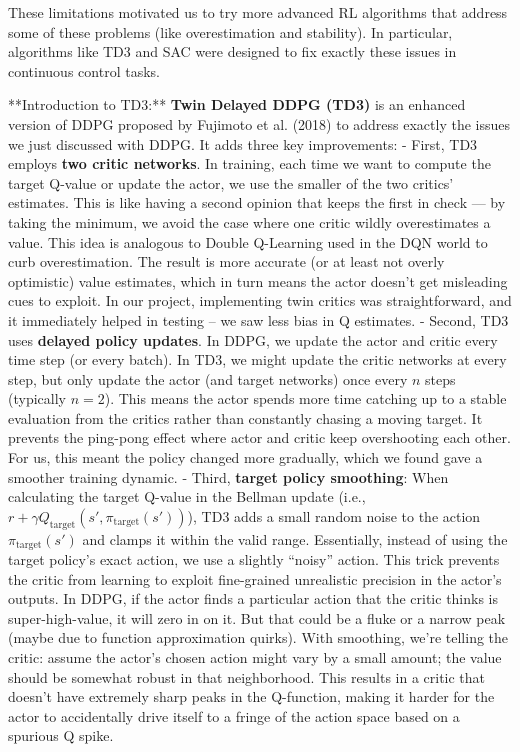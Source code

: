 \documentclass[11pt]{article}
\begin{document}
		These limitations motivated us to try more advanced RL algorithms that address some of these problems (like overestimation and stability). In particular, algorithms like TD3 and SAC were designed to fix exactly these issues in continuous control tasks.
	
	
	
		**Introduction to TD3:** \textbf{Twin Delayed DDPG (TD3)} is an enhanced version of DDPG proposed by Fujimoto et al. (2018) to address exactly the issues we just discussed with DDPG. It adds three key improvements:
		- First, TD3 employs \textbf{two critic networks}. In training, each time we want to compute the target Q-value or update the actor, we use the smaller of the two critics’ estimates. This is like having a second opinion that keeps the first in check — by taking the minimum, we avoid the case where one critic wildly overestimates a value. This idea is analogous to Double Q-Learning used in the DQN world to curb overestimation. The result is more accurate (or at least not overly optimistic) value estimates, which in turn means the actor doesn’t get misleading cues to exploit. In our project, implementing twin critics was straightforward, and it immediately helped in testing – we saw less bias in Q estimates.
		- Second, TD3 uses \textbf{delayed policy updates}. In DDPG, we update the actor and critic every time step (or every batch). In TD3, we might update the critic networks at every step, but only update the actor (and target networks) once every $n$ steps (typically $n=2$). This means the actor spends more time catching up to a stable evaluation from the critics rather than constantly chasing a moving target. It prevents the ping-pong effect where actor and critic keep overshooting each other. For us, this meant the policy changed more gradually, which we found gave a smoother training dynamic.
		- Third, \textbf{target policy smoothing}: When calculating the target Q-value in the Bellman update (i.e., $r + \gamma Q_{\text{target}}(s', \pi_{\text{target}}(s'))$), TD3 adds a small random noise to the action $\pi_{\text{target}}(s')$ and clamps it within the valid range. Essentially, instead of using the target policy’s exact action, we use a slightly “noisy” action. This trick prevents the critic from learning to exploit fine-grained unrealistic precision in the actor’s outputs. In DDPG, if the actor finds a particular action that the critic thinks is super-high-value, it will zero in on it. But that could be a fluke or a narrow peak (maybe due to function approximation quirks). With smoothing, we’re telling the critic: assume the actor’s chosen action might vary by a small amount; the value should be somewhat robust in that neighborhood. This results in a critic that doesn’t have extremely sharp peaks in the Q-function, making it harder for the actor to accidentally drive itself to a fringe of the action space based on a spurious Q spike.
\end{document}
